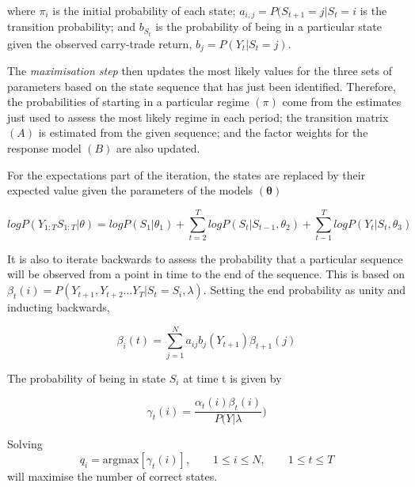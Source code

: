 \documentclass[12pt, a4paper, oneside]{article} %
\begin{document}
where $\pi_i$ is the initial probability of each state; $a_{i,j} = P(S_{t+1} = j| S_t = i$ is the transition probability; and $b_{S_t}$ is the probability of being in a particular state given the observed carry-trade return, $b_j = P(Y_t|S_t = j)$.

The \emph{maximisation step} then updates the most likely values for the three sets of parameters based on the state sequence that has just been identified. Therefore, the probabilities of starting in a particular regime $(\pi)$ come from the estimates just used to assess the most likely regime in each period; the transition matrix $(A)$ is estimated from the given sequence; and the factor weights for the response model $(B)$ are also updated. 

For the expectations part of the iteration, the states are replaced by their expected value given the parameters of the models $(\mathbf{\theta})$

\begin{equation} 
log P(Y_{1:T}S_{1:T}| \theta) = log P(S_1|\theta_1) + \sum_{t=2}^T log P(S_t|S_{t-1}, \theta_2) + \sum_{t-1}^T log P(Y_t|S_t, \theta_3)
\end{equation}

It is also to iterate backwards to assess the probability that a particular sequence will be observed from a point in time to the end of the sequence.  This is based on $\beta_t(i) = P(Y_{t+1}, Y_{t+2}\dots Y_T| S_t = S_i, \lambda)$. Setting the end probability as unity and inducting backwards, 

\begin{equation} 
\beta_i(t) = \sum_{j = 1}^N a_{ij}b_j(Y_{t+1})\beta_{t+1}(j)
\end{equation}

The probability of being in state $S_i$ at time t is given by 

\begin{equation}
\gamma_t(i) = \frac{\alpha_t(i)\beta_t(i)}{P(Y|\lambda})
\end{equation}

Solving
\begin{equation}
q_i = \text{argmax} [\gamma_t(i)], \qquad 1 \leq i \leq N, \qquad 1 \leq t \leq T  
\end{equation}
will maximise the number of correct states. 

\end{document}
